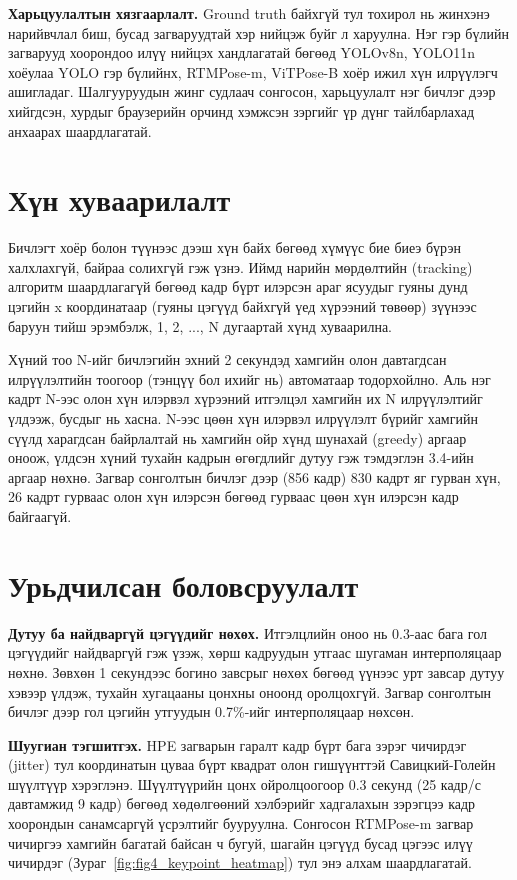 \textbf{Харьцуулалтын хязгаарлалт.} Ground truth байхгүй тул тохирол нь жинхэнэ нарийвчлал биш, бусад загваруудтай хэр нийцэж буйг л харуулна. Нэг гэр бүлийн загварууд хоорондоо илүү нийцэх хандлагатай бөгөөд YOLOv8n, YOLO11n хоёулаа YOLO гэр бүлийнх, RTMPose-m, ViTPose-B хоёр ижил хүн илрүүлэгч ашигладаг. Шалгууруудын жинг судлаач сонгосон, харьцуулалт нэг бичлэг дээр хийгдсэн, хурдыг браузерийн орчинд хэмжсэн зэргийг үр дүнг тайлбарлахад анхаарах шаардлагатай.

\section{Хүн хуваарилалт}

Бичлэгт хоёр болон түүнээс дээш хүн байх бөгөөд хүмүүс бие биеэ бүрэн халхлахгүй, байраа солихгүй гэж үзнэ. Иймд нарийн мөрдөлтийн (tracking) алгоритм шаардлагагүй бөгөөд кадр бүрт илэрсэн араг ясуудыг гуяны дунд цэгийн x координатаар (гуяны цэгүүд байхгүй үед хүрээний төвөөр) зүүнээс баруун тийш эрэмбэлж, 1, 2, ..., N дугаартай хүнд хуваарилна.

Хүний тоо N-ийг бичлэгийн эхний 2 секундэд хамгийн олон давтагдсан илрүүлэлтийн тоогоор (тэнцүү бол ихийг нь) автоматаар тодорхойлно. Аль нэг кадрт N-ээс олон хүн илэрвэл хүрээний итгэлцэл хамгийн их N илрүүлэлтийг үлдээж, бусдыг нь хасна. N-ээс цөөн хүн илэрвэл илрүүлэлт бүрийг хамгийн сүүлд харагдсан байрлалтай нь хамгийн ойр хүнд шунахай (greedy) аргаар оноож, үлдсэн хүний тухайн кадрын өгөгдлийг дутуу гэж тэмдэглэн 3.4-ийн аргаар нөхнө. Загвар сонголтын бичлэг дээр (856 кадр) 830 кадрт яг гурван хүн, 26 кадрт гурваас олон хүн илэрсэн бөгөөд гурваас цөөн хүн илэрсэн кадр байгаагүй.

\section{Урьдчилсан боловсруулалт}

\textbf{Дутуу ба найдваргүй цэгүүдийг нөхөх.} Итгэлцлийн оноо нь 0.3-аас бага гол цэгүүдийг найдваргүй гэж үзэж, хөрш кадруудын утгаас шугаман интерполяцаар нөхнө. Зөвхөн 1 секундээс богино завсрыг нөхөх бөгөөд үүнээс урт завсар дутуу хэвээр үлдэж, тухайн хугацааны цонхны оноонд оролцохгүй. Загвар сонголтын бичлэг дээр гол цэгийн утгуудын 0.7\%-ийг интерполяцаар нөхсөн.

\textbf{Шуугиан тэгшитгэх.} HPE загварын гаралт кадр бүрт бага зэрэг чичирдэг (jitter) тул координатын цуваа бүрт квадрат олон гишүүнттэй Савицкий-Голейн шүүлтүүр \cite{savitzky1964} хэрэглэнэ. Шүүлтүүрийн цонх ойролцоогоор 0.3 секунд (25 кадр/с давтамжид 9 кадр) бөгөөд хөдөлгөөний хэлбэрийг хадгалахын зэрэгцээ кадр хоорондын санамсаргүй үсрэлтийг бууруулна. Сонгосон RTMPose-m загвар чичиргээ хамгийн багатай байсан ч бугуй, шагайн цэгүүд бусад цэгээс илүү чичирдэг (Зураг~\ref{fig:fig4_keypoint_heatmap}) тул энэ алхам шаардлагатай.

